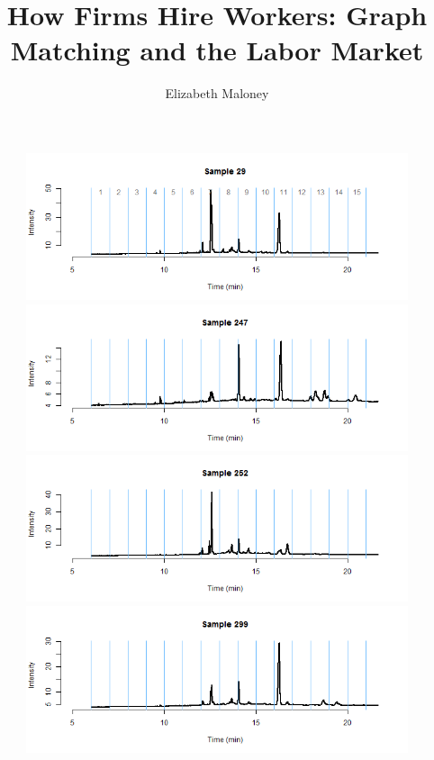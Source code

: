 \documentclass[11pt]{article}
\theoremstyle{plain}
\theoremstyle{definition}
\begin{document}
 

\title{How Firms Hire Workers: Graph Matching and the Labor Market}
\author{Elizabeth Maloney}
\begin{figure}[H]
\begin{center}
\includegraphics[trim ={3.5cm 2.7cm 2cm 2cm},scale=.6, clip=true]{BinPlotDMC_25.png}
\includegraphics[trim ={3.5cm 2.7cm 2cm 2cm},scale=.6, clip=true]{BinPlotDMC_26.png}
\includegraphics[trim ={3.5cm 2.7cm 2cm 2cm},scale=.6, clip=true]{BinPlotDMC_27.png}
\includegraphics[trim ={3.5cm 2.7cm 2cm 2cm},scale=.6, clip=true]{BinPlotDMC_28.png}

\end{center}
\end{figure}
\end{document}
